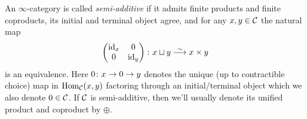 \documentclass[a4paper, 10pt, oneside, DIV=9, chapterprefix=true, numbers=enddot,bibliography=totoc]{scrbook}
\begin{document}
 An $\infty$-category is called \emph{semi-additive} if it admits finite products and finite coproducts, its initial and terminal object agree, and for any $x,y\in \mathcal{C}$ the natural map
\begin{equation*}
	\begin{pmatrix}
		\id_x & 0\\
		0 & \id_y
	\end{pmatrix}\colon x\sqcup y\isomorphism x\times y
\end{equation*}
is an equivalence. Here $0\colon x\morphism 0\morphism y$ denotes the unique (up to contractible choice) map in $\operatorname{Hom}_{\mathcal{C}}(x,y)$ factoring through an initial/terminal object which we also denote $0\in \mathcal{C}$. If $\mathcal{C}$ is semi-additive, then we'll usually denote its unified product and coproduct by $\oplus$.
\end{document}
